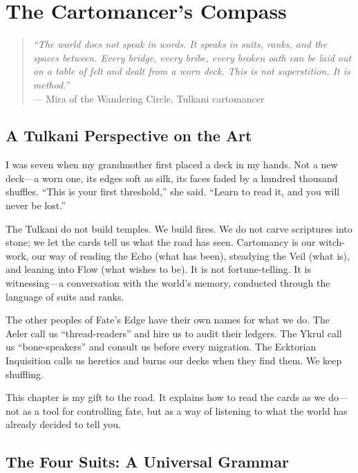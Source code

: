 \documentclass[11pt,letterpaper,twoside]{book}
\begin{document}
\chapter*{The Cartomancer's Compass}
\label{chap:cartomancer-compass}

\begin{quote}
\textit{``The world does not speak in words. It speaks in suits, ranks, and the spaces between. Every bridge, every bribe, every broken oath can be laid out on a table of felt and dealt from a worn deck. This is not superstition. It is method.''}\\
\hfill --- Mira of the Wandering Circle, Tulkani cartomancer
\end{quote}

\section*{A Tulkani Perspective on the Art}

I was seven when my grandmother first placed a deck in my hands. Not a new deck---a worn one, its edges soft as silk, its faces faded by a hundred thousand shuffles. ``This is your first threshold,'' she said. ``Learn to read it, and you will never be lost.''

The Tulkani do not build temples. We build fires. We do not carve scriptures into stone; we let the cards tell us what the road has seen. Cartomancy is our witch-work, our way of reading the Echo (what has been), steadying the Veil (what is), and leaning into Flow (what wishes to be). It is not fortune-telling. It is witnessing---a conversation with the world's memory, conducted through the language of suits and ranks.

The other peoples of Fate's Edge have their own names for what we do. The Aeler call us ``thread-readers'' and hire us to audit their ledgers. The Ykrul call us ``bone-speakers'' and consult us before every migration. The Ecktorian Inquisition calls us heretics and burns our decks when they find them. We keep shuffling.

This chapter is my gift to the road. It explains how to read the cards as we do---not as a tool for controlling fate, but as a way of listening to what the world has already decided to tell you.

\section*{The Four Suits: A Universal Grammar}
\end{document}
